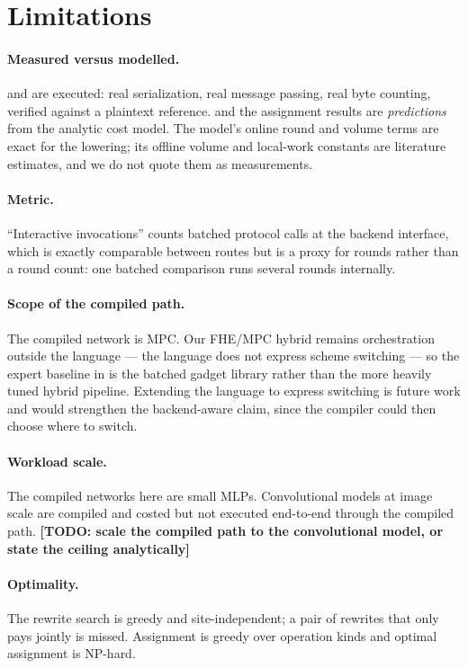 \documentclass[11pt]{article}
\newcommand{\TODO}[1]{{\color{red}\textbf{[TODO: #1]}}}
\begin{document}
\section{Limitations}\label{sec:limitations}

\paragraph{Measured versus modelled.}  and
 are executed: real serialization, real message passing,
real byte counting, verified against a plaintext reference.
 and the assignment results are \emph{predictions} from
the analytic cost model. The model's online round and volume terms are exact
for the lowering; its offline volume and local-work constants are literature
estimates, and we do not quote them as measurements.

\paragraph{Metric.} ``Interactive invocations'' counts batched protocol calls
at the backend interface, which is exactly comparable between routes but is a
proxy for rounds rather than a round count: one batched comparison runs
several rounds internally.

\paragraph{Scope of the compiled path.} The compiled network is MPC. Our
FHE/MPC hybrid remains orchestration outside the language --- the language does
not express scheme switching --- so the expert baseline in
 is the batched gadget library rather than the more
heavily tuned hybrid pipeline. Extending the language to express switching is
future work and would strengthen the backend-aware claim, since the compiler
could then choose where to switch.

\paragraph{Workload scale.} The compiled networks here are small MLPs.
Convolutional models at image scale are compiled and costed but not executed
end-to-end through the compiled path. \TODO{scale the compiled path to the
convolutional model, or state the ceiling analytically}

\paragraph{Optimality.} The rewrite search is greedy and site-independent; a
pair of rewrites that only pays jointly is missed. Assignment is greedy over
operation kinds and optimal assignment is NP-hard.
\end{document}
